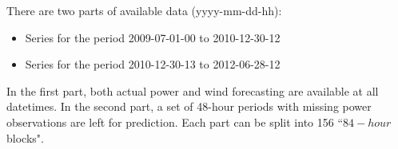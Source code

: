\documentclass[conference]{IEEEtran}
\begin{document}
There are two parts of available data (yyyy-mm-dd-hh):
\begin{itemize}
\item Series for the period 2009-07-01-00 to 2010-12-30-12
\item Series for the period 2010-12-30-13 to 2012-06-28-12
\end{itemize}
In the first part, both actual power and wind forecasting are available at all datetimes. In the second part, a set of 48-hour periods with missing power observations are left for prediction. Each part can be split into 156 ``$84-hour$ blocks".


\end{document}
